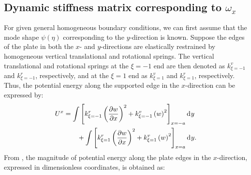 \documentclass[preprint,12pt,number]{elsarticle}
\newcommand{\id}{\mathrm{d}\mkern1mu}
\begin{document}
\subsection{Dynamic stiffness matrix corresponding to $\omega_x$}\label{sec:DSMx}
For given general homogeneous boundary conditions, we can first assume that the mode shape $\psi(\eta)$ corresponding to the $y$-direction is known. 
Suppose the edges of the plate in both the $x$- and $y$-directions are elastically restrained by homogeneous vertical translational and rotational springs.
The vertical translational and rotational springs at the $\xi = -1$ end are then denoted as $k^v_{\xi = -1}$ and $k^r_{\xi = -1}$, respectively, and at the $\xi = 1$ end as $k^v_{\xi = 1}$ and $k^r_{\xi = 1}$, respectively. 
Thus, the potential energy along the supported edge in the $x$-direction can be expressed by:
%
\begin{equation}\label{eq:poten_energy_edgex}
\begin{split}
	U^{x} &=  \int\left[k^r_{\xi=-1} \left( \frac{\partial w}{\partial x} \right)^2 + k^v_{\xi=-1} \left( w \right)^2\right]_{x=-a} \id y\\
	&\qquad +  \int\left[k^r_{\xi=1} \left( \frac{\partial w}{\partial x} \right)^2 + k^v_{\xi=1} \left( w \right)^2\right]_{x=a} \id y.
\end{split}
\end{equation}
%
From , the magnitude of potential energy along the plate edges in the $x$-direction, expressed in dimensionless coordinates, is obtained as:
\end{document}
